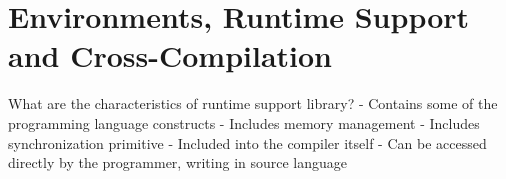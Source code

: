 \section{Environments, Runtime Support and Cross-Compilation}



What are the characteristics of runtime support library?
- Contains some of the programming language constructs
- Includes memory management
- Includes synchronization primitive
- Included into the compiler itself
- Can be accessed directly by the programmer, writing in source language










